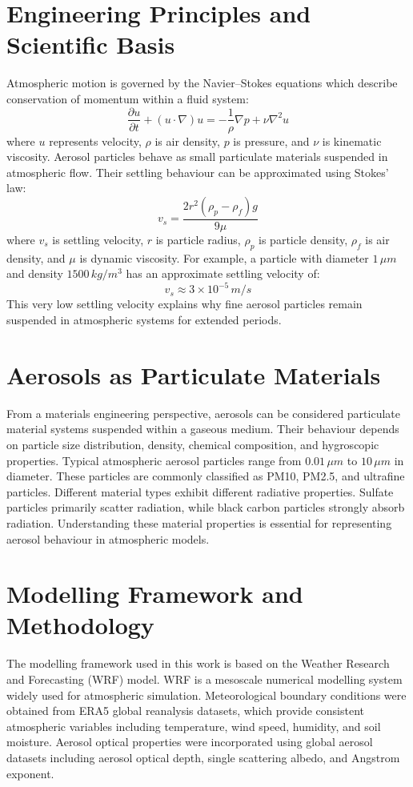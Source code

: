 \documentclass[12pt]{article}
\begin{document}
\section{Engineering Principles and Scientific Basis}
Atmospheric motion is governed by the Navier--Stokes equations which describe conservation of momentum within a fluid system:
\begin{equation}
\frac{\partial u}{\partial t} + (u \cdot \nabla)u =
-\frac{1}{\rho}\nabla p + \nu\nabla^2u
\end{equation}
where $u$ represents velocity, $\rho$ is air density, $p$ is pressure, and $\nu$ is kinematic viscosity.
Aerosol particles behave as small particulate materials suspended in atmospheric flow. Their settling behaviour can be approximated using Stokes' law:
\begin{equation}
v_s = \frac{2 r^2 (\rho_p - \rho_f) g}{9 \mu}
\end{equation}
where $v_s$ is settling velocity, $r$ is particle radius, $\rho_p$ is particle density, $\rho_f$ is air density, and $\mu$ is dynamic viscosity.
For example, a particle with diameter $1 \, \mu m$ and density $1500 \, kg/m^3$ has an approximate settling velocity of:
\[
v_s \approx 3 \times 10^{-5} \, m/s
\]
This very low settling velocity explains why fine aerosol particles remain suspended in atmospheric systems for extended periods.
\section{Aerosols as Particulate Materials}
From a materials engineering perspective, aerosols can be considered particulate material systems suspended within a gaseous medium. Their behaviour depends on particle size distribution, density, chemical composition, and hygroscopic properties.
Typical atmospheric aerosol particles range from $0.01\,\mu m$ to $10\,\mu m$ in diameter. These particles are commonly classified as PM10, PM2.5, and ultrafine particles.
Different material types exhibit different radiative properties. Sulfate particles primarily scatter radiation, while black carbon particles strongly absorb radiation.
Understanding these material properties is essential for representing aerosol behaviour in atmospheric models.
\section{Modelling Framework and Methodology}
The modelling framework used in this work is based on the Weather Research and Forecasting (WRF) model. WRF is a mesoscale numerical modelling system widely used for atmospheric simulation.
Meteorological boundary conditions were obtained from ERA5 global reanalysis datasets, which provide consistent atmospheric variables including temperature, wind speed, humidity, and soil moisture.
Aerosol optical properties were incorporated using global aerosol datasets including aerosol optical depth, single scattering albedo, and Angstrom exponent.
\end{document}
